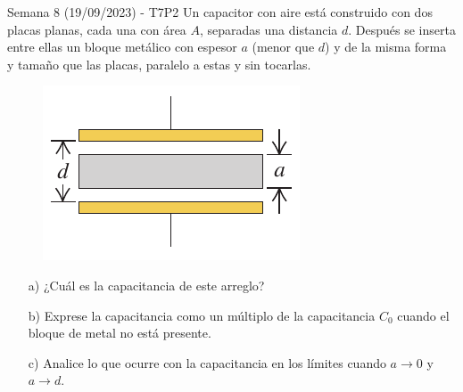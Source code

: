 \begin{frame}{Semana 8 (19/09/2023) - T7P2}
    Un capacitor con aire está construido con dos placas planas, cada una con área $A$, separadas una distancia $d$. Después se inserta entre ellas un bloque metálico con espesor $a$ (menor que $d$) y de la misma forma y tamaño que las placas, paralelo a estas y sin tocarlas.

    \begin{figure}[H]
        \centering
        \includegraphics[scale=0.5]{figures/t7p1.png}
    \end{figure}
    
    \begin{itemize}
        \item[a)] ¿Cuál es la capacitancia de este arreglo?
        \item[b)] Exprese la capacitancia como un múltiplo de la capacitancia $C_0$ cuando el bloque de metal no está presente.
        \item[c)] Analice lo que ocurre con la capacitancia en los límites cuando $a\rightarrow0$ y $a\rightarrow d$.
    \end{itemize}
\end{frame}


